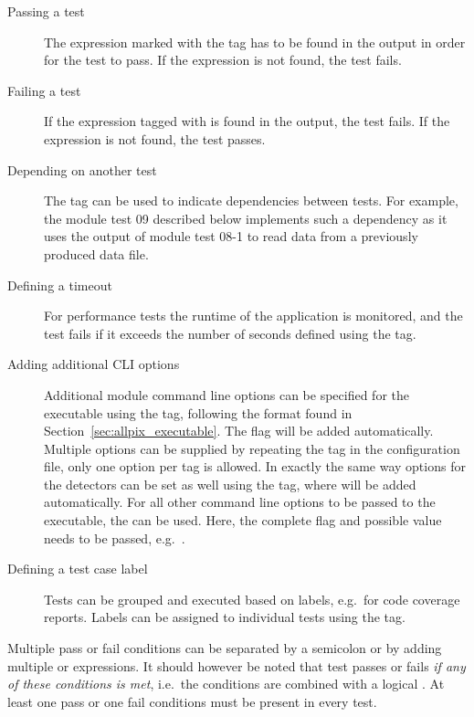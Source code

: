 \begin{description}
  \item[Passing a test] The expression marked with the tag  has to be found in the output in order for the test to pass. If the expression is not found, the test fails.
  \item[Failing a test] If the expression tagged with  is found in the output, the test fails. If the expression is not found, the test passes.
  \item[Depending on another test] The tag  can be used to indicate dependencies between tests. For example, the module test 09 described below implements such a dependency as it uses the output of module test 08-1 to read data from a previously produced \apsq data file.
  \item[Defining a timeout] For performance tests the runtime of the application is monitored, and the test fails if it exceeds the number of seconds defined using the  tag.
  \item[Adding additional CLI options] Additional module command line options can be specified for the  executable using the  tag, following the format found in Section~\ref{sec:allpix_executable}. The  flag will be added automatically. Multiple options can be supplied by repeating the  tag in the configuration file, only one option per tag is allowed. In exactly the same way options for the detectors can be set as well using the  tag, where  will be added automatically.
  For all other command line options to be passed to the executable, the  can be used. Here, the complete flag and possible value needs to be passed, e.g.\ .
  \item[Defining a test case label] Tests can be grouped and executed based on labels, e.g.\ for code coverage reports. Labels can be assigned to individual tests using the  tag.
\end{description}

Multiple pass or fail conditions can be separated by a semicolon or by adding multiple  or  expressions.
It should however be noted that test passes or fails \emph{if any of these conditions is met}, i.e.\ the conditions are combined with a logical .
At least one pass or one fail conditions must be present in every test.

